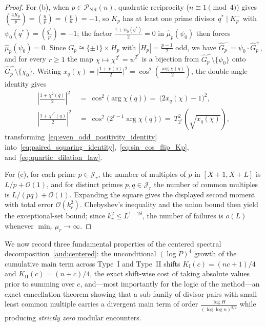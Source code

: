 \documentclass[11pt, a4paper]{article}
\theoremstyle{plain}
\theoremstyle{definition}
\newcommand{\leg}[2]{\left(\frac{#1}{#2}\right)}
\newcommand{\I}{\mathrm{I}}
\newcommand{\II}{\mathrm{II}}
\begin{document}
\begin{proof}
For (b), when $p\in\mathcal{P}_{\mathrm{NR}}(n)$, quadratic reciprocity ($n\equiv1\pmod 4$) gives $\leg{4K_p}{p}=\leg{n}{p}=\leg{p}{n}=-1$, so $K_p$ has at least one prime divisor $q^{\ast}\mid K_p^{-}$ with $\psi_0(q^{\ast})=\leg{q^{\ast}}{p}=-1$; the factor $\frac{1+\psi_0(q^{\ast})}{2}=0$ in $\widehat{\mu}_p(\psi_0)$ then forces $\widehat{\mu}_p(\psi_0)=0$. Since $G_p\cong\{\pm1\}\times H_p$ with $|H_p|=\frac{p-1}{2}$ odd, we have $\widehat{G}_p^{-}=\psi_0\cdot\widehat{G}_p^{+}$, and for every $r\ge1$ the map $\chi\mapsto\chi^{2^{r}}=\psi^{2^{r}}$ is a bijection from $\widehat{G}_p^{-}\setminus\{\psi_0\}$ onto $\widehat{G}_p^{+}\setminus\{\chi_0\}$. Writing $x_q(\chi)=\big|\frac{1+\chi(q)}{2}\big|^{2}=\cos^{2}(\frac{\arg\chi(q)}{2})$, the double-angle identity gives
\[
\begin{aligned}
\left|\frac{1+\chi^{2}(q)}{2}\right|^{2}\ &=\ \cos^{2}\big(\arg\chi(q)\big)\ =\ \big(2x_q(\chi)-1\big)^{2},\\
\left|\frac{1+\chi^{2^{r}}(q)}{2}\right|^{2}\ &=\ \cos^{2}\big(2^{r-1}\arg\chi(q)\big)\ =\ T_{2^{r}}^{2}\!\left(\sqrt{x_q(\chi)}\right),
\end{aligned}
\]
transforming~\eqref{eq:even_odd_positivity_identity} into~\eqref{eq:paired_squaring_identity},~\eqref{eq:sin_cos_flip_Kp}, and~\eqref{eq:quartic_dilation_law}.

For (c), for each prime $p\in\mathcal{J}_r$, the number of multiples of $p$ in $[X+1,X+L]$ is $L/p+\mathcal{O}(1)$, and for distinct primes $p,q\in\mathcal{J}_r$ the number of common multiples is $L/(pq)+\mathcal{O}(1)$. Expanding the square gives the displayed second moment with total error $\mathcal{O}(k_r^{2})$. Chebyshev's inequality and the union bound then yield the exceptional-set bound; since $k_r^{2}\le L^{1-2\delta}$, the number of failures is $o(L)$ whenever $\min_r\mu_r\to\infty$.
\end{proof}

We now record three fundamental properties of the centered spectral decomposition~\eqref{aud:centered}: the unconditional $(\log P)^{4}$ growth of the cumulative main term across Type~I and Type~II shifts $K_{\I}(c)=(nc+1)/4$ and $K_{\II}(c)=(n+c)/4$, the exact shift-wise cost of taking absolute values prior to summing over $c$, and---most importantly for the logic of the method---an exact cancellation theorem showing that a sub-family of divisor pairs with small least common multiple carries a divergent main term of order $\frac{\log H}{(\log\log n)^{3/2}}$ while producing \emph{strictly zero} modular encounters.
\end{document}
